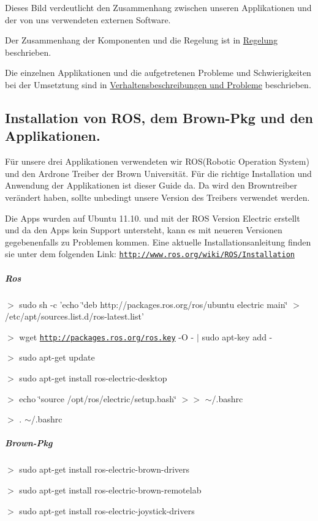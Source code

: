 Dieses Bild verdeutlicht den Zusammenhang zwischen unseren Applikationen und der von uns verwendeten externen Software.

Der Zusammenhang der Komponenten und die Regelung ist in \hyperlink{page1}{Regelung} beschrieben.

Die einzelnen Applikationen und die aufgetretenen Probleme und Schwierigkeiten bei der Umsetztung sind in \hyperlink{page2}{Verhaltensbeschreibungen und Probleme} beschrieben.

\subsection*{Installation von ROS, dem Brown-\/Pkg und den Applikationen. }

Für unsere drei Applikationen verwendeten wir ROS(Robotic Operation System) und den Ardrone Treiber der Brown Universität. Für die richtige Installation und Anwendung der Applikationen ist dieser Guide da. Da wird den Browntreiber verändert haben, sollte unbedingt unsere Version des Treibers verwendet werden.

Die Apps wurden auf Ubuntu 11.10. und mit der ROS Version Electric erstellt und da den Apps kein Support untersteht, kann es mit neueren Versionen gegebenenfalls zu Problemen kommen. Eine aktuelle Installationsanleitung finden sie unter dem folgenden Link: \href{http://www.ros.org/wiki/ROS/Installation}{\tt http://www.ros.org/wiki/ROS/Installation}

\subparagraph*{Ros }

$>$ sudo sh -\/c 'echo \char`\"{}deb http://packages.ros.org/ros/ubuntu electric main\char`\"{} $>$ /etc/apt/sources.list.d/ros-\/latest.list'

$>$ wget \href{http://packages.ros.org/ros.key}{\tt http://packages.ros.org/ros.key} -\/O -\/ $|$ sudo apt-\/key add -\/

$>$ sudo apt-\/get update

$>$ sudo apt-\/get install ros-\/electric-\/desktop

$>$ echo \char`\"{}source /opt/ros/electric/setup.bash\char`\"{} $>$$>$ $\sim$/.bashrc

$>$ . $\sim$/.bashrc

\subparagraph*{Brown-\/Pkg }

$>$ sudo apt-\/get install ros-\/electric-\/brown-\/drivers

$>$ sudo apt-\/get install ros-\/electric-\/brown-\/remotelab

$>$ sudo apt-\/get install ros-\/electric-\/joystick-\/drivers


